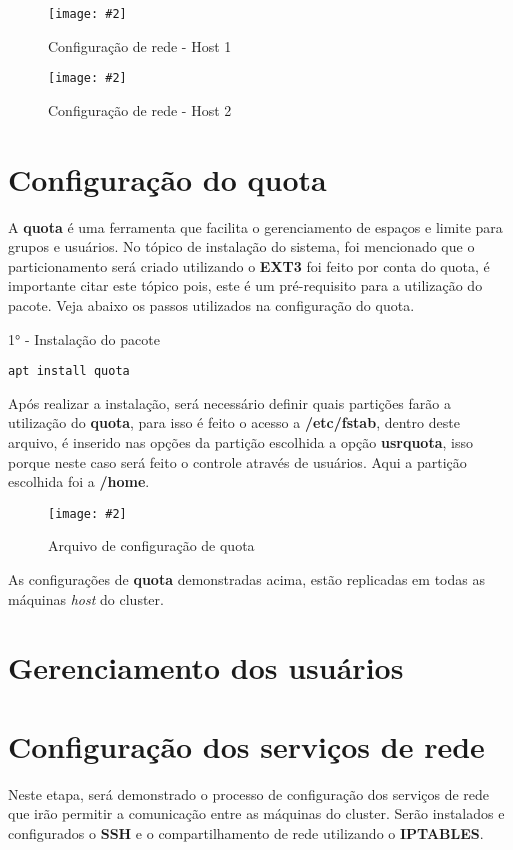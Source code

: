 \documentclass[
	12pt,				%
	openany,			%
	a4paper,			%
	chapter=TITLE,		%
	section=TITLE,		%
	english,
	brazil				%
]{abntex2}
\newcommand{\includeImage}[3] {

\begin{figure}[H]
 	 \centering
  		\texttt{[image: \#2]}
  	\caption{#3}
\end{figure}

}
\begin{document}
\includeImage{0.5}{imgs/2_configuracao_rede/host/1_host_1.png}{Configuração de rede - Host 1}
\includeImage{0.5}{imgs/2_configuracao_rede/host/1_host_2.png}{Configuração de rede - Host 2}

\section{Configuração do quota}

A \textbf{quota} é uma ferramenta que facilita o gerenciamento de espaços e limite para grupos e usuários. No tópico de instalação do sistema, foi mencionado que o particionamento será criado utilizando o \textbf{EXT3} foi feito por conta do quota, é importante citar este tópico pois, este é um pré-requisito para a utilização do pacote. Veja abaixo os passos utilizados na configuração do quota. 

1° - Instalação do pacote

\begin{lstlisting}
apt install quota
\end{lstlisting}

Após realizar a instalação, será necessário definir quais partições farão a utilização do \textbf{quota}, para isso é feito o acesso a \textbf{/etc/fstab}, dentro deste arquivo, é inserido nas opções da partição escolhida a opção \textbf{usrquota}, isso porque neste caso será feito o controle através de usuários. Aqui a partição escolhida foi a \textbf{/home}.

\includeImage{0.5}{imgs/3_configuracao_quota/1.png}{Arquivo de configuração de quota}

As configurações de \textbf{quota} demonstradas acima, estão replicadas em todas as máquinas \textit{host} do cluster. 

\section{Gerenciamento dos usuários}

\section{Configuração dos serviços de rede}

Neste etapa, será demonstrado o processo de configuração dos serviços de rede que irão permitir a comunicação entre as máquinas do cluster. Serão instalados e configurados o \textbf{SSH} e o compartilhamento de rede utilizando o \textbf{IPTABLES}.
\end{document}
